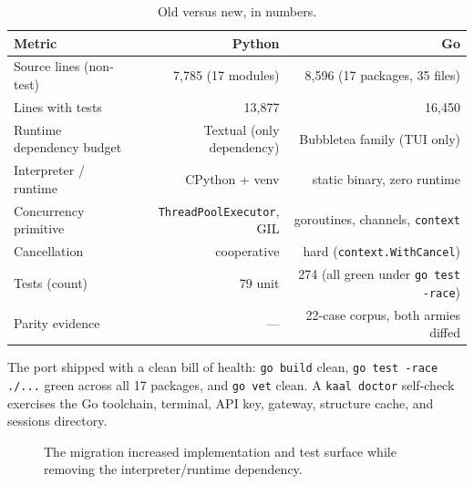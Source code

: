 \documentclass[11pt,a4paper]{article}
\begin{document}
\begin{table}[ht]
\centering
\small
\begin{tabularx}{\textwidth}{@{}Yrr@{}}
\toprule
\textbf{Metric} & \textbf{Python} & \textbf{Go} \\
\midrule
Source lines (non-test) & 7,785 (17 modules) & 8,596 (17 packages, 35 files) \\
Lines with tests & 13,877 & 16,450 \\
Runtime dependency budget & Textual (only dependency) & Bubbletea family (TUI only) \\
Interpreter / runtime & CPython + venv & static binary, zero runtime \\
Concurrency primitive & \texttt{ThreadPoolExecutor}, GIL & goroutines, channels, \texttt{context} \\
Cancellation & cooperative & hard (\texttt{context.WithCancel}) \\
Tests (count) & 79 unit & 274 (all green under \texttt{go test -race}) \\
Parity evidence & --- & 22-case corpus, both armies diffed \\
\bottomrule
\end{tabularx}
\caption{Old versus new, in numbers.}
\label{tab:results}
\end{table}

\noindent
The port shipped with a clean bill of health: \texttt{go build} clean, \texttt{go test -race ./...} green across all 17 packages, and \texttt{go vet} clean. A \texttt{kaal doctor} self-check exercises the Go toolchain, terminal, API key, gateway, structure cache, and sessions directory.

\begin{figure}[ht]
\centering
{}
\caption{The migration increased implementation and test surface while removing the interpreter/runtime dependency.}
\label{fig:results}
\end{figure}
\end{document}
